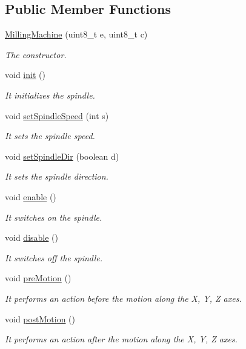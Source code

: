 \subsection*{Public Member Functions}
\begin{DoxyCompactItemize}
\item 
\hyperlink{class_milling_machine_afdeaae37d959bd4c9de40195a2650aa4}{Milling\+Machine} (uint8\+\_\+t e, uint8\+\_\+t c)
\begin{DoxyCompactList}\small\item\em The constructor. \end{DoxyCompactList}\item 
void \hyperlink{class_milling_machine_ad8b30fc42959606e9773e5ae7e31bac7}{init} ()
\begin{DoxyCompactList}\small\item\em It initializes the spindle. \end{DoxyCompactList}\item 
void \hyperlink{class_milling_machine_a4c41fa0e6f882281ffc3b67a1771da57}{set\+Spindle\+Speed} (int s)
\begin{DoxyCompactList}\small\item\em It sets the spindle speed. \end{DoxyCompactList}\item 
void \hyperlink{class_milling_machine_a5c49cbbcd45406c9537ccac8f7c22c39}{set\+Spindle\+Dir} (boolean d)
\begin{DoxyCompactList}\small\item\em It sets the spindle direction. \end{DoxyCompactList}\item 
void \hyperlink{class_milling_machine_af965377184ed3bc3ed56763cd652d10f}{enable} ()
\begin{DoxyCompactList}\small\item\em It switches on the spindle. \end{DoxyCompactList}\item 
void \hyperlink{class_milling_machine_a6e1eb0b5f72e31ad0505b5f61613831d}{disable} ()
\begin{DoxyCompactList}\small\item\em It switches off the spindle. \end{DoxyCompactList}\item 
void \hyperlink{class_milling_machine_a3987303895b4d73ed7bc9346cbdf163f}{pre\+Motion} ()
\begin{DoxyCompactList}\small\item\em It performs an action before the motion along the X, Y, Z axes. \end{DoxyCompactList}\item 
void \hyperlink{class_milling_machine_a1939dadb13a2552867eff5ed4ede94ac}{post\+Motion} ()
\begin{DoxyCompactList}\small\item\em It performs an action after the motion along the X, Y, Z axes. \end{DoxyCompactList}\end{DoxyCompactItemize}
